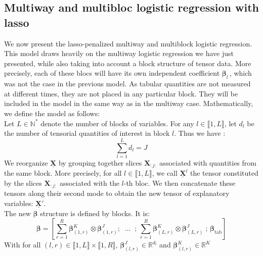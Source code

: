 \documentclass[10pt]{article}
\begin{document}
\subsection{Multiway and multibloc logistic regression with lasso}

We now present the lasso-penalized multiway and multiblock logistic regression. This model draws heavily on the multiway logistic regression we have just presented, while also taking into account a block structure of tensor data. More precisely, each of these blocs will have its own independent coefficient $\bm{\beta}_l \,$, which was not the case in the previous model. As tabular quantities are not measured at different times, they are not placed in any particular block. They will be included in the model in the same way as in the multiway case. Mathematically, we define the model as follows:\\
\indent Let $L \in \mathbb{N}^{*}$ denote the number of blocks of variables. For any $l \in \llbracket 1, L \rrbracket$, let $d_l$ be the number of tensorial quantities of interest in block $l$. Thus we have :
$$\sum\limits_{l = 1}^L d_l = J$$
\indent We reorganize $\underline{\mathbf{X}}$ by grouping together slices $\mathbf{X}_{:j:}$ associated with quantities from the same block. More precisely, for all $l \in \llbracket 1, L \rrbracket$, we call  $\underline{\mathbf{X}}^{l}$  the tensor constituted by the slices $\mathbf{X}_{:j:}$ associated with the $l$-th bloc. We then concatenate these tensors along their second mode to obtain the new tensor of explanatory variables: $\underline{\mathbf{X}}'$.\\[5 pt]
\indent The new $\bm{\beta}$ structure is defined by blocks. It is:
\begin{equation}
\bm{\beta} = \left[ \sum\limits_{r = 1}^R \bm{\beta}_{(1,r)}^K \otimes \bm{\beta}_{(1,r)}^J;   \; \; \hdots  \; \; ;\, \sum\limits_{r = 1}^R \bm{\beta}_{(L,r)}^K \otimes \bm{\beta}_{(L,r)}^J\; ;\,\bm{\beta}_{\text{tab}}   \right]
\end{equation}
With for all $(l,r) \in \llbracket 1,L \rrbracket \times \llbracket 1, R\rrbracket$, $\bm{\beta}_{(l,r)}^J \in \mathbb{R}^{d_l}$ and $\bm{\beta}_{(l,r)}^K \in \mathbb{R}^{K}$  \\
\end{document}
